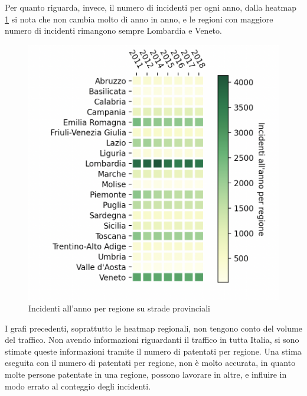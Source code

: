 \documentclass[a4paper]{report}
\begin{document}
Per quanto riguarda, invece, il numero di incidenti per ogni anno, 
dalla heatmap \ref{fig:regione-heatmap} 
si nota che non cambia molto di anno in anno, e le regioni con maggiore numero di incidenti 
rimangono sempre Lombardia e Veneto.


\begin{figure}
    \includegraphics[width=\linewidth]{../src/incidenti/incidenti_aci/mappe_regioni/regioni_heatmap.png}
    \caption{Incidenti all'anno per regione su strade provinciali}
    \label{fig:regione-heatmap}
\end{figure}

I grafi precedenti, soprattutto le heatmap regionali, non tengono conto del volume del traffico.
Non avendo informazioni riguardanti il traffico in tutta Italia, si sono stimate queste informazioni 
tramite il numero di patentati per regione.
Una stima eseguita con il numero di patentati per regione, non è molto accurata, 
in quanto molte persone patentate in una regione, possono lavorare in altre, e influire 
in modo errato al conteggio degli incidenti. 
\end{document}
